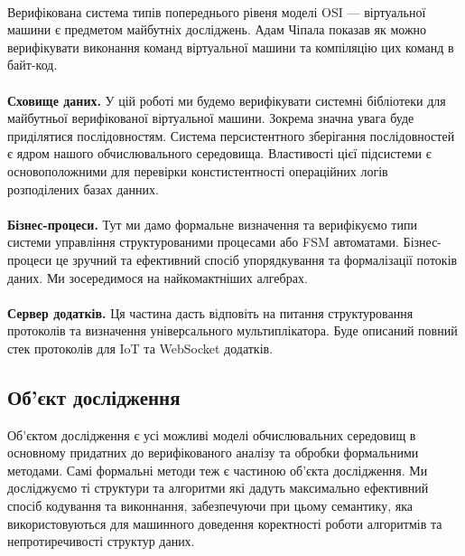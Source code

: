 \documentclass[11pt,oneside]{article}
\begin{document}
   \paragraph{}
   Верифікована система типів попереднього рівеня моделі OSI --- віртуальної машини
   є предметом майбутніх досліджень. Адам Чіпала \cite{chipvm} показав як можно
   верифікувати виконання команд віртуальної машини та компіляцію цих команд в байт-код.

   \paragraph{}
   {\bf Сховище даних.} У цій роботі ми будемо верифікувати системні бібліотеки для майбутньої верифікованої
   віртуальної машини. Зокрема значна увага буде приділятися послідовностям.
   Система персистентного зберігання послідовностей є ядром нашого
   обчислювального середовища. Властивості цієї підсистеми є основоположними
   для перевірки констистентності операційних логів розподілених базах данних.

   \paragraph{}
   {\bf Бізнес-процеси.} Тут ми дамо формальне визначення та верифікуємо
   типи системи управління структурованими процесами або FSM автоматами.
   Бізнес-процеси це зручний та ефективний спосіб упорядкування та формалізації
   потоків даних. Ми зосередимося на найкомактніших алгебрах.

   \paragraph{}
   {\bf Сервер додатків.} Ця частина дасть відповіть на питання структуровання
   протоколів та визначення універсального мультиплікатора. Буде описаний повний стек
   протоколів для IoT та WebSocket додатків.

\newpage
\subsection{Об’єкт дослідження}
\vspace{0.5cm}

   Об’єктом дослідження є усі можливі моделі обчислювальних середовищ в основному придатних
   до верифікованого аналізу та обробки формальними методами. Самі формальні методи теж є
   частиною об’єкта дослідження. Ми досліджуємо ті структури та алгоритми які дадуть
   максимально ефективний спосіб кодування та виконнання, забезпечуючи при цьому семантику,
   яка використовуються для машинного доведення коректності роботи алгоритмів та непротиречивості структур даних.
\end{document}
